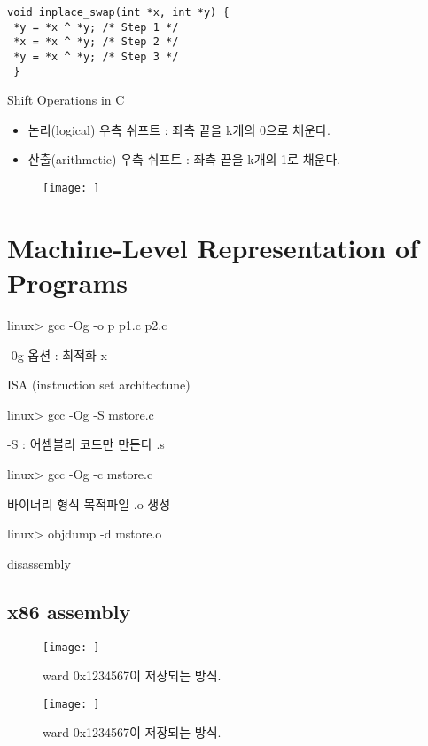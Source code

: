 \begin{lstlisting}[style = CStyle]
void inplace_swap(int *x, int *y) {
 *y = *x ^ *y; /* Step 1 */
 *x = *x ^ *y; /* Step 2 */
 *y = *x ^ *y; /* Step 3 */
 }
\end{lstlisting}


Shift Operations in C

\begin{itemize}
    \item  논리(logical) 우측 쉬프트 : 좌측 끝을 k개의 0으로 채운다.
    \item  산출(arithmetic) 우측 쉬프트 : 좌측 끝을 k개의 1로 채운다.
\end{itemize}
\begin{figure}[h!]
    \centering
    \texttt{[image: ]}
\end{figure}


\section{Machine-Level Representation of Programs}


linux> gcc -Og -o p p1.c p2.c


-0g 옵션 : 최적화 x

ISA (instruction set architectune)

linux> gcc -Og -S mstore.c

-S : 어셈블리 코드만 만든다 .s

linux> gcc -Og -c mstore.c

바이너리 형식 목적파일 .o  생성


linux> objdump -d mstore.o

disassembly


\subsection{x86 assembly}


\begin{figure}[h!]
    \centering
    \texttt{[image: ]}
    \caption{ward 0x1234567이 저장되는 방식.}
\end{figure}




\begin{figure}[h!]
    \centering
    \texttt{[image: ]}
    \caption{ward 0x1234567이 저장되는 방식.}
\end{figure}





